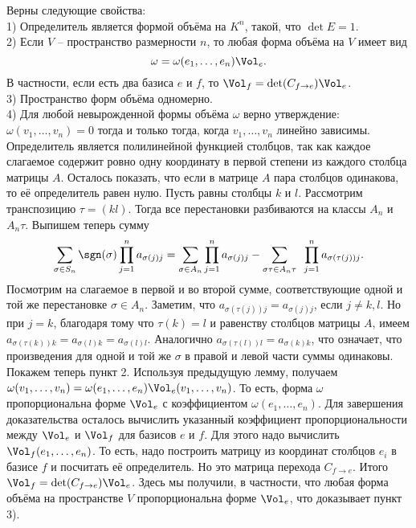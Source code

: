 \thrm Верны следующие свойства:\\
1) Определитель является формой объёма на $K^n$, такой, что $\det E=1$.\\
2) Если $V$ -- пространство размерности $n$, то любая форма объёма на $V$ имеет вид $$\omega=\omega(e_1,\dots,e_n)\Vol_e.$$
В частности, если есть два базиса $e$ и $f$, то $\Vol_{f}=\det(C_{f \to e}) \Vol_{e}$.\\
3) Пространство форм объёма одномерно.\\
4) Для любой невырожденной формы объёма $\omega$ верно утверждение: $\omega(v_1,\dots,v_n)=0$ тогда и только тогда, когда $v_1,\dots,v_n$ линейно зависимы.
\proof Определитель является полилинейной функцией столбцов, так как  каждое слагаемое содержит ровно одну координату в первой степени из каждого столбца матрицы $A$. Осталось показать, что если в матрице $A$ пара столбцов одинакова, то её определитель равен нулю.
Пусть равны столбцы $k$ и $l$. Рассмотрим транспозицию $\tau=(kl)$. Тогда все перестановки разбиваются на классы $A_n$ и $A_n\tau$. Выпишем теперь сумму
$$\sum_{\sigma \in S_n} \sgn(\sigma)\prod_{j=1}^n a_{\sigma(j)j} = \sum_{\sigma \in A_n} \prod_{j=1}^n a_{\sigma(j)j}- \sum_{\sigma\tau \in A_n\tau}\,\,\, \prod_{j=1}^n a_{\sigma(\tau(j))j}.$$
Посмотрим на слагаемое в первой и во второй сумме, соответствующие одной и той же перестановке $\sigma \in A_n$. Заметим, что $a_{\sigma(\tau(j))j}=a_{\sigma(j)j}$, если $j\neq k,l$. Но при  $j=k$, благодаря тому что $\tau(k)=l$  и равенству столбцов матрицы $A$, имеем $a_{\sigma(\tau(k))k}=a_{\sigma(l)k}=a_{\sigma(l)l}$. Аналогично $a_{\sigma(\tau(l))l}=a_{\sigma(k)k}$, что означает, что произведения для одной и той же $\sigma$ в правой и левой части суммы одинаковы.\\

Покажем теперь пункт 2. Используя предыдущую лемму, получаем $\omega(v_1,\dots,v_n)=\omega(e_1,\dots,e_n)\Vol_e(v_1,\dots,v_n)$. То есть, форма $\omega$ пропорциональна форме $\Vol_e$ с коэффициентом $\omega(e_1,\dots,e_n)$. Для завершения доказательства осталось вычислить указанный коэффициент пропорциональности между $\Vol_e$ и $\Vol_f$ для базисов $e$ и $f$. Для этого надо вычислить $\Vol_f(e_1,\dots,e_n)$. То есть, надо построить матрицу из координат столбцов $e_i$ в базисе $f$ и посчитать её определитель. Но это матрица перехода $C_{f\to e}$. Итого $\Vol_{f}=\det(C_{f\to e}) \Vol_{e}$. Здесь мы получили, в частности, что любая форма объёма на пространстве $V$  пропорциональна форме $\Vol_e$, что доказывает пункт 3).


